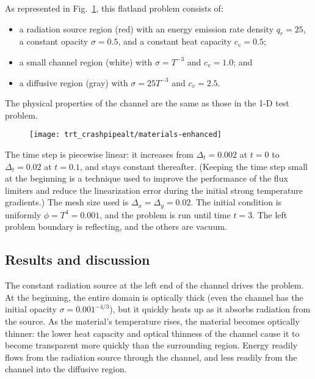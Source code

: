 As represented in Fig.~\ref{fig:crashaltMaterials}, this flatland problem
consists of:
\begin{itemize}
  \item a radiation source region (red) with an energy emission rate density
    $q_r=25$, 
    a constant opacity $\sigma=0.5$, and a constant heat capacity $c_v=0.5$;
  \item a small channel region (white) with $\sigma = T^{-3}$ and $c_v=1.0$; and
  \item a diffusive region (gray) with $\sigma = 25 T^{-3}$ and $c_v=2.5$.
\end{itemize}
The physical properties of the channel are the same as those in the 1-D test
problem.
%
\begin{figure}[htb]
  \centering
  \texttt{[image: trt\_crashpipealt/materials-enhanced]}
  \label{fig:crashaltMaterials}
\end{figure}

The time step is piecewise linear: it increases from $\Delta_t=0.002$ at $t=0$
to $\Delta_t=0.02$ at $t=0.1$, and stays constant thereafter. (Keeping the
time step small at the beginning is a technique used to improve the
performance of the flux limiters and reduce the linearization error during the
initial strong temperature gradients.) The mesh size used
is $\Delta_x=\Delta_y=0.02$. The initial condition is uniformly $\phi = T^4 = 0.001$, and
the problem is run until time $t=3$. The left problem boundary is reflecting,
and the others are vacuum.

\subsection{Results and discussion}

The constant radiation source at the left end of the channel
drives the problem. At the beginning, the entire domain is optically thick
(even the channel has the initial opacity $\sigma=0.001^{-4/3}$), but it quickly
heats up as it absorbs radiation from the source. As the material's
temperature rises, the material becomes optically
thinner: the lower heat capacity and optical thinness of the channel cause it to
become transparent more quickly than the surrounding region. Energy readily
flows from the radiation source through the channel, and less readily from the
channel into the diffusive region.

